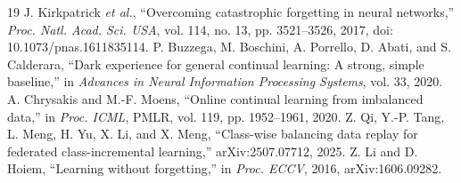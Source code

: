 \documentclass[journal,10pt]{IEEEtran}
\begin{document}
\begin{thebibliography}{19}
 J. Kirkpatrick \emph{et al.}, ``Overcoming catastrophic forgetting in neural networks,'' \emph{Proc. Natl. Acad. Sci. USA}, vol. 114, no. 13, pp. 3521--3526, 2017, doi: 10.1073/pnas.1611835114.
 P. Buzzega, M. Boschini, A. Porrello, D. Abati, and S. Calderara, ``Dark experience for general continual learning: A strong, simple baseline,'' in \emph{Advances in Neural Information Processing Systems}, vol. 33, 2020.
 A. Chrysakis and M.-F. Moens, ``Online continual learning from imbalanced data,'' in \emph{Proc. ICML}, PMLR, vol. 119, pp. 1952--1961, 2020.
 Z. Qi, Y.-P. Tang, L. Meng, H. Yu, X. Li, and X. Meng, ``Class-wise balancing data replay for federated class-incremental learning,'' arXiv:2507.07712, 2025.
 Z. Li and D. Hoiem, ``Learning without forgetting,'' in \emph{Proc. ECCV}, 2016, arXiv:1606.09282.
\end{thebibliography}
\end{document}
